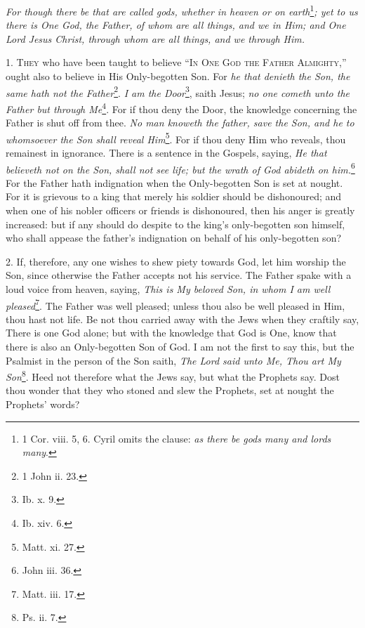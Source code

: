 
\emph{For though there be that are called gods, whether in heaven or on earth}\footnote{1 Cor. viii. 5, 6. Cyril omits the clause: \emph{as there be gods many and lords many}.}\emph{; yet to us there is One God, the Father, of whom are all things, and we in Him; and One Lord Jesus Christ, through whom are all things, and we through Him.}

1. \textsc{They} who have been taught to believe “\textsc{In One God the Father Almighty},” ought also to believe in His Only-begotten Son. For \emph{he that denieth the Son, the same hath not the Father}\footnote{1 John ii. 23.}. \emph{I am the Door}\footnote{Ib. x. 9.}, saith Jesus; \emph{no one cometh unto the Father but through Me}\footnote{Ib. xiv. 6.}. For if thou deny the Door, the knowledge concerning the Father is shut off from thee. \emph{No man knoweth the father, save the Son, and he to whomsoever the Son shall reveal Him}\footnote{Matt. xi. 27.}. For if thou deny Him who reveals, thou remainest in ignorance. There is a sentence in the Gospels, saying, \emph{He that believeth not on the Son, shall not see life; but the wrath of God abideth on him.}\footnote{John iii. 36.} For the Father hath indignation when the Only-begotten Son is set at nought. For it is grievous to a king that merely his soldier should be dishonoured; and when one of his nobler officers or friends is dishonoured, then his anger is greatly increased: but if any should do despite to the king’s only-begotten son himself, who shall appease the father’s indignation on behalf of his only-begotten son?

2. If, therefore, any one wishes to shew piety towards God, let him worship the Son, since otherwise the Father accepts not his service. The Father spake with a loud voice from heaven, saying, \emph{This is My beloved Son, in whom I am well pleased}\footnote{Matt. iii. 17.}. The Father was well pleased; unless thou also be well pleased in Him, thou hast not life. Be not thou carried away with the Jews when they craftily say, There is one God alone; but with the knowledge that God is One, know that there is also an Only-begotten Son of God. I am not the first to say this, but the Psalmist in the person of the Son saith, \emph{The Lord said unto Me, Thou art My Son}\footnote{Ps. ii. 7.}. Heed not therefore what the Jews say, but what the Prophets say. Dost thou wonder that they who stoned and slew the Prophets, set at nought the Prophets’ words?

